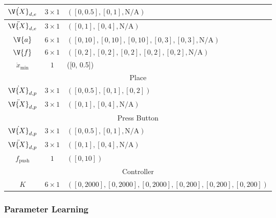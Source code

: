 \begin{table*}[ht!]
\begin{tabular}{|c|c|l|}
    \hline
           $\dot{\V{X}}_{d,e}$  & $3 \times 1$ & $([0, 0.5], [0, 1], \text{N/A})$  \\
         \hline
         $\ddot{\V{X}}_{d,e}$ & $3 \times 1$ & $([0, 1], [0, 4], \text{N/A})$\\
         \hline
         $\V{a}$ & $6 \times 1$ & $([0,10],[0,10],[0,10],[0,3],[0,3],\text{N/A})$\\
         \hline
         $\V{f}$ & $6 \times 1$ & $([0,2],[0,2],[0,2],[0,2],[0, 2],\text{N/A})$\\
         \hline
         $\dot{x}_\text{min}$ & $1$ & ([0, 0.5])\\
         \hline
    \multicolumn{3}{|c|}{Place} \\
    \hline
       $\dot{\V{X}}_{d,p}$  & $3 \times 1$ & $([0, 0.5], [0, 1], [0, 2])$  \\
         \hline
         $\ddot{\V{X}}_{d,p}$ & $3 \times 1$ & $([0, 1], [0, 4], \text{N/A})$\\
         \hline
     \multicolumn{3}{|c|}{Press Button} \\
    \hline
       $\dot{\V{X}}_{d,p}$  & $3 \times 1$ & $([0, 0.5], [0, 1], \text{N/A})$  \\
         \hline
         $\ddot{\V{X}}_{d,p}$ & $3 \times 1$ & $([0, 1], [0, 4], \text{N/A})$\\
         \hline
         $f_\text{push}$ & $1$ & $([0,10])$\\
         \hline
         \multicolumn{3}{|c|}{Controller} \\
         \hline
         $K$ & $6 \times 1$ & $([0, 2000], [0, 2000], [0, 2000], [0, 200], [0, 200], [0, 200])$\\
         \hline
    \end{tabular}
\end{table*}

\subsubsection{Parameter Learning}

